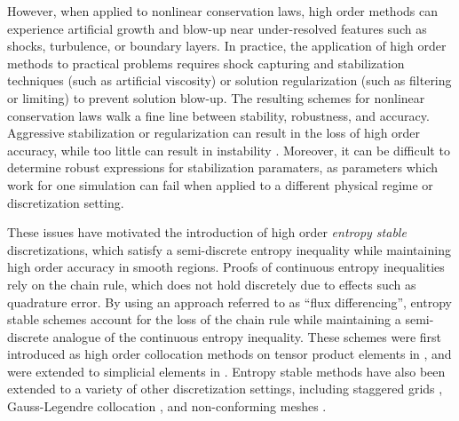 \documentclass[review]{siamart0216}
\theoremstyle{assumption}
\begin{document}
However, 
when applied to nonlinear conservation laws, high order methods can experience artificial growth and blow-up near under-resolved features such as shocks, turbulence, or boundary layers.  In practice, the application of high order methods to practical problems requires shock capturing and stabilization techniques (such as artificial viscosity) or solution regularization (such as filtering or limiting) to prevent solution blow-up.  The resulting schemes for nonlinear conservation laws walk a fine line between stability, robustness, and accuracy.  Aggressive stabilization or regularization can result in the loss of high order accuracy, while too little can result in instability \cite{wang2013high}.  Moreover, it can be difficult to determine robust expressions for stabilization paramaters, as parameters which work for one simulation can fail when applied to a different physical regime or discretization setting.  

These issues have motivated the introduction of high order \textit{entropy stable} discretizations, which satisfy a semi-discrete entropy inequality while maintaining high order accuracy in smooth regions.  Proofs of continuous entropy inequalities rely on the chain rule, which does not hold discretely due to effects such as quadrature error.   By using an approach referred to as ``flux differencing'', entropy stable schemes account for the loss of the chain rule while maintaining a semi-discrete analogue of the continuous entropy inequality.  These schemes were first introduced as high order collocation methods on tensor product elements in \cite{fisher2013high, carpenter2014entropy, gassner2016split, gassner2017br1}, and were extended to simplicial elements in \cite{crean2017high, chen2017entropy, crean2018entropy, chan2017discretely, chan2018discretely}.  Entropy stable methods have also been extended to a variety of other discretization settings, including staggered grids \cite{parsani2016entropy}, Gauss-Legendre collocation \cite{chan2018efficient}, and non-conforming meshes \cite{friedrich2017entropy}.  
\end{document}
